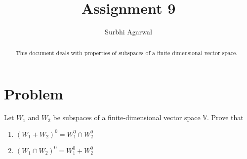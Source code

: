\documentclass[journal,12pt,twocolumn]{IEEEtran}
\begin{document}
\let\StandardTheFigure\thefigure
\let\vec\mathbf

\renewcommand{\thefigure}{\theproblem}

\def\putbox#1#2#3{\makebox[0in][l]{\makebox[#1][l]{}\raisebox{\baselineskip}[0in][0in]{\raisebox{#2}[0in][0in]{#3}}}}
     \def\rightbox#1{\makebox[0in][r]{#1}}
     \def\centbox#1{\makebox[0in]{#1}}
     \def\topbox#1{\raisebox{-\baselineskip}[0in][0in]{#1}}
     \def\midbox#1{\raisebox{-0.5\baselineskip}[0in][0in]{#1}}
\vspace{3cm}

\title{Assignment 9}
\author{Surbhi Agarwal}

\maketitle

\newpage


\bigskip

\renewcommand{\thefigure}{\theenumi}
\renewcommand{\thetable}{\theenumi}

\begin{abstract}
This document deals with properties of subspaces of a finite dimensional vector space.
\end{abstract}

\section{Problem}
Let $W_1$ and $W_2$ be subspaces of a finite-dimensional vector space $\mathbb V$. Prove that
\begin{enumerate}
    \item $(W_1 + W_2)^0 = W_1^0 \cap W_2^0$
    \item $(W_1 \cap W_2)^0 = W_1^0 + W_2^0$
\end{enumerate}
\end{document}
